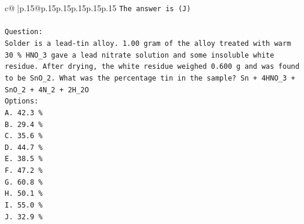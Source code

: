 \documentclass{article}
\begin{document}
{\begin{supertabular}{c@{$\;$}|p{.15\linewidth}@{}p{.15\linewidth}p{.15\linewidth}p{.15\linewidth}p{.15\linewidth}p{.15\linewidth}}
{{{\texttt{The answer is (J)} \\
\\ 
\texttt{Question:} \\
\texttt{Solder is a lead{-}tin alloy. 1.00 gram of the alloy treated with warm 30 \% HNO\_3 gave a lead nitrate solution and some insoluble white residue. After drying, the white residue weighed 0.600 g and was found to be SnO\_2. What was the percentage tin in the sample? Sn + 4HNO\_3 + SnO\_2 + 4N\_2 + 2H\_2O} \\
\texttt{Options:} \\
\texttt{A. 42.3 \%} \\
\texttt{B. 29.4 \%} \\
\texttt{C. 35.6 \%} \\
\texttt{D. 44.7 \%} \\
\texttt{E. 38.5 \%} \\
\texttt{F. 47.2 \%} \\
\texttt{G. 60.8 \%} \\
\texttt{H. 50.1 \%} \\
\texttt{I. 55.0 \%} \\
\texttt{J. 32.9 \%} \\
            }
        }
    }
     \\ \\


\end{supertabular}}
\end{document}
